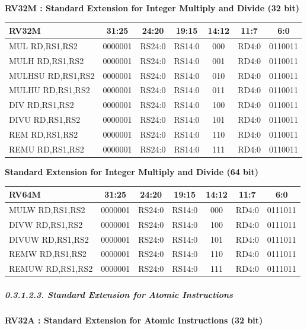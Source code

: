 \documentclass[
]{article}
\begin{document}
\textbf{RV32M : Standard Extension for Integer Multiply and Divide (32
bit)}

\begin{longtable}[]{@{}lcccccc@{}}
\toprule
RV32M & 31:25 & 24:20 & 19:15 & 14:12 & 11:7 & 6:0\tabularnewline
\midrule
\endhead
MUL RD,RS1,RS2 & 0000001 & RS24:0 & RS14:0 & 000 & RD4:0 &
0110011\tabularnewline
MULH RD,RS1,RS2 & 0000001 & RS24:0 & RS14:0 & 001 & RD4:0 &
0110011\tabularnewline
MULHSU RD,RS1,RS2 & 0000001 & RS24:0 & RS14:0 & 010 & RD4:0 &
0110011\tabularnewline
MULHU RD,RS1,RS2 & 0000001 & RS24:0 & RS14:0 & 011 & RD4:0 &
0110011\tabularnewline
DIV RD,RS1,RS2 & 0000001 & RS24:0 & RS14:0 & 100 & RD4:0 &
0110011\tabularnewline
DIVU RD,RS1,RS2 & 0000001 & RS24:0 & RS14:0 & 101 & RD4:0 &
0110011\tabularnewline
REM RD,RS1,RS2 & 0000001 & RS24:0 & RS14:0 & 110 & RD4:0 &
0110011\tabularnewline
REMU RD,RS1,RS2 & 0000001 & RS24:0 & RS14:0 & 111 & RD4:0 &
0110011\tabularnewline
\bottomrule
\end{longtable}

\textbf{Standard Extension for Integer Multiply and Divide (64 bit)}

\begin{longtable}[]{@{}lcccccc@{}}
\toprule
RV64M & 31:25 & 24:20 & 19:15 & 14:12 & 11:7 & 6:0\tabularnewline
\midrule
\endhead
MULW RD,RS1,RS2 & 0000001 & RS24:0 & RS14:0 & 000 & RD4:0 &
0111011\tabularnewline
DIVW RD,RS1,RS2 & 0000001 & RS24:0 & RS14:0 & 100 & RD4:0 &
0111011\tabularnewline
DIVUW RD,RS1,RS2 & 0000001 & RS24:0 & RS14:0 & 101 & RD4:0 &
0111011\tabularnewline
REMW RD,RS1,RS2 & 0000001 & RS24:0 & RS14:0 & 110 & RD4:0 &
0111011\tabularnewline
REMUW RD,RS1,RS2 & 0000001 & RS24:0 & RS14:0 & 111 & RD4:0 &
0111011\tabularnewline
\bottomrule
\end{longtable}

\hypertarget{standard-extension-for-atomic-instructions}{%
\subparagraph{0.3.1.2.3. Standard Extension for Atomic
Instructions}\label{standard-extension-for-atomic-instructions}}

\textbf{RV32A : Standard Extension for Atomic Instructions (32 bit)}
\end{document}
